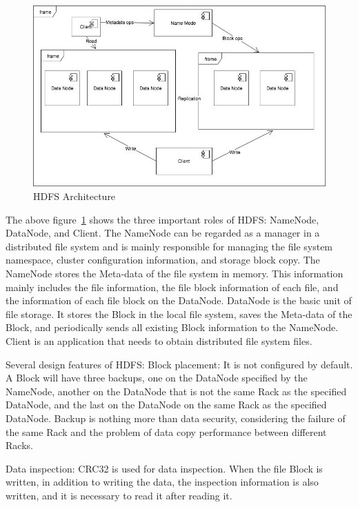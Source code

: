 \begin{figure}[!ht]
  \centering\includegraphics[width=\columnwidth]{images/HDFS.jpg}
  \caption{HDFS Architecture}\label{f:hdfs}
\end{figure}


The above figure~\ref{f:hdfs} shows the three important roles of HDFS: NameNode, DataNode, and Client. The NameNode can be regarded as a manager in a distributed file system and is mainly responsible for managing the file system namespace, cluster configuration information, and storage block copy. The NameNode stores the Meta-data of the file system in memory. This information mainly includes the file information, the file block information of each file, and the information of each file block on the DataNode. DataNode is the basic unit of file storage. It stores the Block in the local file system, saves the Meta-data of the Block, and periodically sends all existing Block information to the NameNode. Client is an application that needs to obtain distributed file system files. 

Several design features of HDFS:
Block placement: It is not configured by default. A Block will have three backups, one on the DataNode specified by the NameNode, another on the DataNode that is not the same Rack as the specified DataNode, and the last on the DataNode on the same Rack as the specified DataNode. Backup is nothing more than data security, considering the failure of the same Rack and the problem of data copy performance between different Racks.


Data inspection: CRC32 is used for data inspection. When the file Block is written, in addition to writing the data, the inspection information is also written, and it is necessary to read it after reading it.

